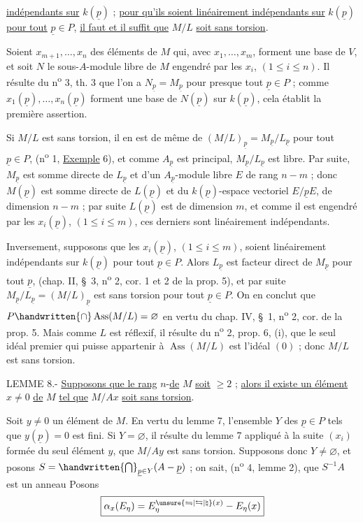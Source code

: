 \uline{indépendants sur} $k(\underline p)$ ; \uline{pour qu'ils soient linéairement indépendants sur} $k(\underline p)$ \uline{pour tout} $\underline p\in P$, \uline{il faut et il suffit que} $M/L$ \uline{soit sans torsion}.

Soient $x_{m+1},\ldots,x_n$ des éléments de $M$ qui, avec $x_1,\ldots,x_m$, forment une base de $V$, et soit $N$ le sous-$A$-module libre de $M$ engendré par les $x_i$, $(1\leq i\leq n)$. Il résulte du n\textsuperscript{o} 3, th. 3 que l'on a $N_{\underline p}=M_{\underline p}$ pour presque tout $\underline p\in P$ ; comme $x_1(\underline p),\ldots,x_n(\underline p)$ forment une base de $N(\underline p)$ sur $k(\underline p)$, cela établit la première assertion.

Si $M/L$ est sans torsion, il en est de même de $(M/L)_{\underline p}=M_{\underline p}/L_{\underline p}$ pour tout $\underline p\in P$, (n\textsuperscript{o} 1, \uline{Exemple} 6), et comme $A_{\underline p}$ est principal, $M_{\underline p}/L_{\underline p}$ est libre. Par suite, $M_{\underline p}$ est somme directe de $L_{\underline p}$ et d'un $A_{\underline p}$-module libre $E$ de rang $n-m$ ; donc $M(\underline p)$ est somme directe de $L(\underline p)$ et du $k(\underline p)$-espace vectoriel $E/\underline p E$, de dimension $n-m$ ; par suite $L(\underline p)$ est de dimension $m$, et comme il est engendré par les $x_i(\underline p)$, $(1\leq i\leq m)$, ces derniers sont linéairement indépendants.

Inversement, supposons que les $x_i(\underline p)$, $(1\leq i\leq m)$, soient linéairement indépendants sur $k(\underline p)$ pour tout $\underline p\in P$. Alors $L_{\underline p}$ est facteur direct de $M_{\underline p}$ pour tout $\underline p$, (chap. II, \S~3, n\textsuperscript{o} 2, cor. 1 et 2 de la prop. 5), et par suite $M_{\underline p}/L_{\underline p}=(M/L)_{\underline p}$ est sans torsion pour tout $\underline p\in P$. On en conclut que $P\handwritten{\cap}\operatorname{Ass}(M/L)=\varnothing$ en vertu du chap. IV, \S~1, n\textsuperscript{o} 2, cor. de la prop. 5. Mais comme $L$ est réflexif, il résulte du n\textsuperscript{o} 2, prop. 6, (i), que le seul idéal premier qui puisse appartenir à $\operatorname{Ass}(M/L)$ est l'idéal $(0)$ ; donc $M/L$ est sans torsion.

LEMME 8.- \uline{Supposons que le rang} $n$-\uline{de} $M$ \uline{soit} $\geq 2$ ; \uline{alors il existe un élément} $x\neq 0$ \uline{de} $M$ \uline{tel que} $M/Ax$ \uline{soit sans torsion}.

Soit $y\neq 0$ un élément de $M$. En vertu du lemme 7, l'ensemble $Y$ des $\underline p\in P$ tels que $y(\underline p)=0$ est fini. Si $Y=\varnothing$, il résulte du lemme 7 appliqué à la suite $(x_i)$ formée du seul élément $y$, que $M/Ay$ est sans torsion. Supposons donc $Y\neq\varnothing$, et posons $S=\handwritten{\bigcap}_{\underline p\in Y}(A-\underline p)$ ; on sait, (n\textsuperscript{o} 4, lemme 2), que $S^{-1}A$ est un anneau
Posons
\[
\boxed{\alpha_x(E_\eta)=E_\eta^{\unsure{\leftrightharpoons|\leftrightarrows|\natural}(x)}-E_\eta(x)}
\]


